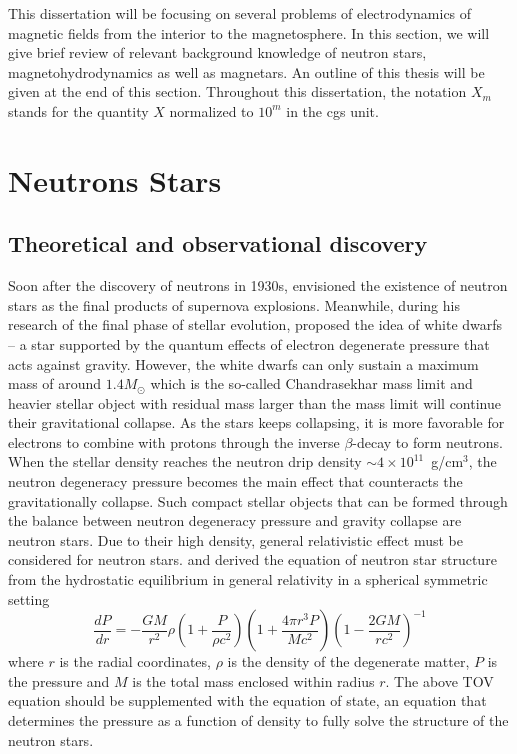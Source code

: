 This dissertation will be focusing on several problems of electrodynamics of magnetic fields from the interior to the magnetosphere. 
In this section, we will give brief review of relevant background knowledge of neutron stars, magnetohydrodynamics as well as magnetars. An outline of this thesis will be given at the end of this section.
Throughout this dissertation, the notation $X_m$ stands for the quantity $X$ normalized to $10^m$ in the cgs unit.

\section{Neutrons Stars}
\label{sec:intro-NS}

\subsection{Theoretical and observational discovery}

Soon after the discovery of neutrons \citep{1932Natur.129Q.312C} in 1930s, \citet{1934PhRv...46...76B} envisioned the existence of neutron stars as the final products of supernova explosions.
Meanwhile, \citet{1935MNRAS..95..226C} during his research of the final phase of stellar evolution, proposed the idea of white dwarfs -- a star supported by the quantum effects of electron degenerate pressure that acts against gravity.
However, the white dwarfs can only sustain a maximum mass of around $1.4M_\odot$ which is the so-called Chandrasekhar mass limit and heavier stellar object with residual mass larger than the mass limit will continue their gravitational collapse.
As the stars keeps collapsing, it is more favorable for electrons to combine with protons through the inverse $\beta$-decay to form neutrons.
When the stellar density reaches the neutron drip density $\sim 4\times 10^{11}$~g/cm$^3$, the neutron degeneracy pressure becomes the main effect that counteracts the gravitationally collapse.
Such compact stellar objects that can be formed through the balance between neutron degeneracy pressure and gravity collapse are neutron stars.
Due to their high density, general relativistic effect must be considered for neutron stars. \citet{1939PhRv...55..364T} and \citet{1939PhRv...55..374O} derived the equation of neutron star structure from the hydrostatic equilibrium in general relativity in a spherical symmetric setting
%
\begin{equation}\label{eq:TOV}
	\frac{d P}{dr} = -\frac{G M}{r^2} \rho \left(1+\frac{P}{\rho c^2} \right) \left( 1+\frac{4\pi r^3 P}{M c^2} \right) \left( 1-\frac{2GM}{rc^2} \right)^{-1}
\end{equation}
%
where $r$ is the radial coordinates, $\rho$ is the density of the degenerate matter, $P$ is the pressure and $M$ is the total mass enclosed within radius $r$.
The above TOV equation should be supplemented with the equation of state, an equation that determines the pressure as a function of density to fully solve the structure of the neutron stars.

